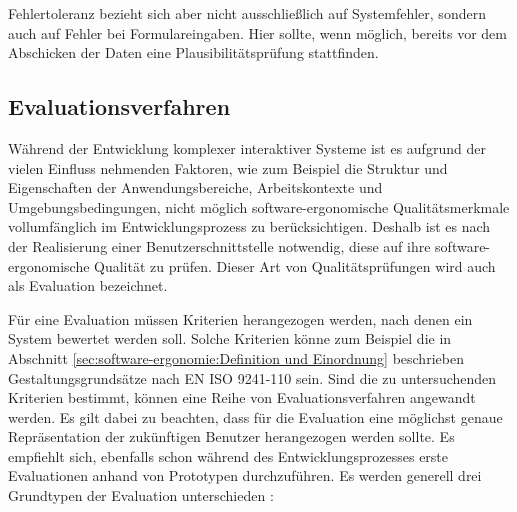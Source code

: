 Fehlertoleranz bezieht sich aber nicht ausschließlich auf Systemfehler, sondern auch auf Fehler bei Formulareingaben. Hier sollte, wenn möglich, bereits vor dem Abschicken der Daten eine Plausibilitätsprüfung stattfinden.


%

\subsection{Evaluationsverfahren}

Während der Entwicklung komplexer interaktiver Systeme ist es aufgrund der vielen Einfluss nehmenden Faktoren, wie zum Beispiel die Struktur und Eigenschaften der Anwendungsbereiche, Arbeitskontexte und Umgebungsbedingungen, nicht möglich software-ergonomische Qualitätsmerkmale vollumfänglich im Entwicklungsprozess zu berücksichtigen. Deshalb ist es nach der Realisierung einer Benutzerschnittstelle notwendig, diese auf ihre software-ergonomische Qualität zu prüfen. Dieser Art von Qualitätsprüfungen wird auch als Evaluation bezeichnet. \parencite[vgl.][207]{Herczeg2009}

Für eine Evaluation müssen Kriterien herangezogen werden, nach denen ein System bewertet werden soll. Solche Kriterien könne zum Beispiel die in Abschnitt \ref{sec:software-ergonomie:Definition und Einordnung} beschrieben Gestaltungsgrundsätze nach EN ISO 9241-110 sein. Sind die zu untersuchenden Kriterien bestimmt, können eine Reihe von Evaluationsverfahren angewandt werden. Es gilt dabei zu beachten, dass für die Evaluation eine möglichst genaue Repräsentation der zukünftigen Benutzer herangezogen werden sollte. Es empfiehlt sich, ebenfalls schon während des Entwicklungsprozesses erste Evaluationen anhand von Prototypen durchzuführen. \parencite[vgl.][208]{Herczeg2009} Es werden generell drei Grundtypen der Evaluation unterschieden \parencite[894\psqq]{Karat1988}:


